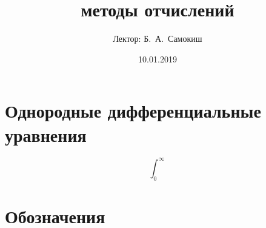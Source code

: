 \documentclass{trlnotes}
\title{методы отчислений}
\date{10.01.2019}
\author{Лектор: Б.~А.~Самокиш}
\begin{document}
 
\maketitle
\tableofcontents
\clearpage

\chapter{Однородные дифференциальные уравнения}


\[
  \int_0^{\infty}
\]

\clearpage

\appendix
\chapter{Обозначения}
% 

\end{document}
